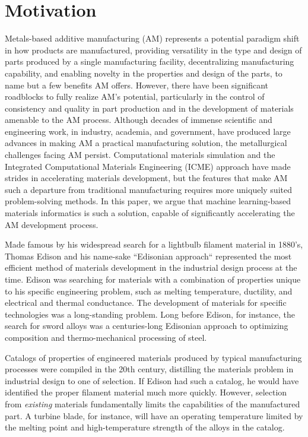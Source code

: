 \section{Motivation}

Metals-based additive manufacturing (AM) represents a potential paradigm shift in how products are manufactured, providing versatility in the type and design of parts produced by a single manufacturing facility, decentralizing manufacturing capability, and enabling novelty in the properties and design of the parts, to name but a few benefits AM offers. However, there have been significant roadblocks to fully realize AM's potential, particularly in the control of consistency and quality in part production and in the development of materials amenable to the AM process. Although decades of immense scientific and engineering work, in industry, academia, and government, have produced large advances in making AM a practical manufacturing solution, the metallurgical challenges facing AM persist. Computational materials simulation and the Integrated Computational Materials Engineering (ICME) approach have made strides in accelerating materials development, but the features that make AM such a departure from traditional manufacturing requires more uniquely suited problem-solving methods. In this paper, we argue that machine learning-based materials informatics is such a solution, capable of significantly accelerating the AM development process.

Made famous by his widespread search for a lightbulb filament material in 1880's, Thomas Edison and his name-sake ``Edisonian approach`` represented the most efficient method of materials development in the industrial design process at the time. Edison was searching for materials with a combination of properties unique to his specific engineering problem, such as melting temperature, ductility, and electrical and thermal conductance. The development of materials for specific technologies was a long-standing problem. Long before Edison, for instance, the search for sword alloys was a centuries-long Edisonian approach to optimizing composition and thermo-mechanical processing of steel. 
  
Catalogs of properties of engineered materials produced by typical manufacturing processes were compiled in the 20th century, distilling the materials problem in industrial design to one of selection. If Edison had such a catalog, he would have identified the proper filament material much more quickly.  However, selection from \emph{existing} materials fundamentally limits the capabilities of the manufactured part.  A turbine blade, for instance, will have an operating temperature limited by the melting point and high-temperature strength of the alloys in the catalog. 

